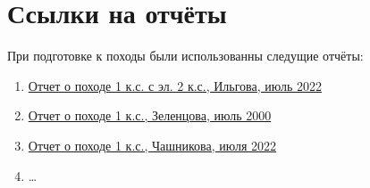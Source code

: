 \section{Ссылки на отчёты}\label{sec:referenses}
    При подготовке к походы были использованны следущие отчёты:
    \begin{enumerate}
        \item \href{https://westra.ru/passes/Reports/3937}{Отчет о походе 1 к.с. с эл. 2 к.с., Ильгова, июль 2022}
        \item \href{https://westra.ru/passes/Reports/3088}{Отчет о походе 1 к.с., Зеленцова, июль 2000}
        \item \href{https://westra.ru/passes/Reports/4018}{Отчет о походе 1 к.с., Чашникова, июля 2022}
        \item \dots
    \end{enumerate}
    